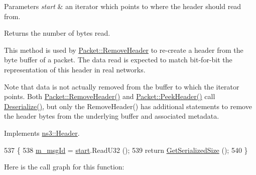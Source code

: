 \begin{DoxyParams}{Parameters}
{\em start} & an iterator which points to where the header should read from. \\
\hline
\end{DoxyParams}
\begin{DoxyReturn}{Returns}
the number of bytes read.
\end{DoxyReturn}
This method is used by \hyperlink{classns3_1_1Packet_a0961eccf975d75f902d40956c93ba63e}{Packet\+::\+Remove\+Header} to re-\/create a header from the byte buffer of a packet. The data read is expected to match bit-\/for-\/bit the representation of this header in real networks.

Note that data is not actually removed from the buffer to which the iterator points. Both \hyperlink{classns3_1_1Packet_a0961eccf975d75f902d40956c93ba63e}{Packet\+::\+Remove\+Header()} and \hyperlink{classns3_1_1Packet_aadc63487bea70945c418f4c3e9b81964}{Packet\+::\+Peek\+Header()} call \hyperlink{classns3_1_1MmWaveIdealHandoverPreparationInfoHeader_ae10b8706c3baaec02d71d5d5823afb8f}{Deserialize()}, but only the Remove\+Header() has additional statements to remove the header bytes from the underlying buffer and associated metadata. 

Implements \hyperlink{classns3_1_1Header_a78be9400bb66b2a8543606f395ef5396}{ns3\+::\+Header}.


\begin{DoxyCode}
537 \{
538   \hyperlink{classns3_1_1MmWaveIdealHandoverPreparationInfoHeader_aa37ea28102a6dd94f352fe04961f3f59}{m\_msgId} = \hyperlink{namespacevisualizer_1_1core_a2a35e5d8a34af358b508dac8635754e0}{start}.ReadU32 ();
539   \textcolor{keywordflow}{return} \hyperlink{classns3_1_1MmWaveIdealHandoverPreparationInfoHeader_aa259110cef49880dff4ce5cd7d3be969}{GetSerializedSize} ();
540 \}
\end{DoxyCode}


Here is the call graph for this function\+:


